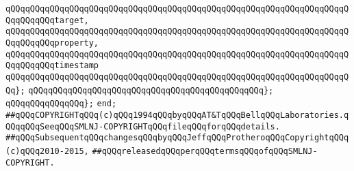 \verb|qQQqqQQqqQQqqQQqqQQqqQQqqQQqqQQqqQQqqQQqqQQqqQQqqQQqqQQqqQQqqQQqqQQqqQQqqQQqqQQqtarget,|\newline
\verb|qQQqqQQqqQQqqQQqqQQqqQQqqQQqqQQqqQQqqQQqqQQqqQQqqQQqqQQqqQQqqQQqqQQqqQQqqQQqqQQqproperty,|\newline
\verb|qQQqqQQqqQQqqQQqqQQqqQQqqQQqqQQqqQQqqQQqqQQqqQQqqQQqqQQqqQQqqQQqqQQqqQQqqQQqqQQqtimestamp|\newline
\verb|qQQqqQQqqQQqqQQqqQQqqQQqqQQqqQQqqQQqqQQqqQQqqQQqqQQqqQQqqQQqqQQqqQQqqQQq};|\newline
\verb|qQQqqQQqqQQqqQQqqQQqqQQqqQQqqQQqqQQqqQQqqQQqqQQq};|\newline
\verb|qQQqqQQqqQQqqQQq};|\newline
\newline
\verb|end;|\newline
\newline
\newline
\verb|##qQQqCOPYRIGHTqQQq(c)qQQq1994qQQqbyqQQqAT&TqQQqBellqQQqLaboratories.qQQqqQQqSeeqQQqSMLNJ-COPYRIGHTqQQqfileqQQqforqQQqdetails.|\newline
\verb|##qQQqSubsequentqQQqchangesqQQqbyqQQqJeffqQQqProtheroqQQqCopyrightqQQq(c)qQQq2010-2015,|\newline
\verb|##qQQqreleasedqQQqperqQQqtermsqQQqofqQQqSMLNJ-COPYRIGHT.|\newline

